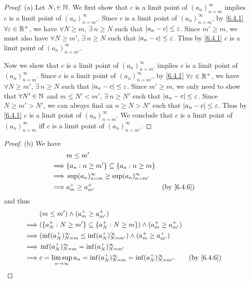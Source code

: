 \begin{proof}{(a)}
  Let \(N, \in \mathbb{N}\).
  We first show that \(c\) is a limit point of \((a_n)_{n = m}^\infty\) implies \(c\) is a limit point of \((a_n)_{n = m'}^\infty\).
  Since \(c\) is a limit point of \((a_n)_{n = m}^\infty\), by \cref{6.4.1} \(\forall \varepsilon \in \mathbb{R}^+\), we have \(\forall N \geq m\), \(\exists\ n \geq N\) such that \(\left\lvert a_n - c\right\rvert \leq \varepsilon\).
  Since \(m' \geq m\), we must also have \(\forall N \geq m'\), \(\exists\ n \geq N\) such that \(\left\lvert a_n - c\right\rvert \leq \varepsilon\).
  Thus by \cref{6.4.1} \(c\) is a limit point of \((a_n)_{n = m'}^\infty\).

  Now we show that \(c\) is a limit point of \((a_n)_{n = m'}^\infty\) implies \(c\) is a limit point of \((a_n)_{n = m}^\infty\).
  Since \(c\) is a limit point of \((a_n)_{n = m'}^\infty\), by \cref{6.4.1} \(\forall \varepsilon \in \mathbb{R}^+\), we have \(\forall N \geq m'\), \(\exists\ n \geq N\) such that \(\left\lvert a_n - c\right\rvert \leq \varepsilon\).
  Since \(m' \geq m\), we only need to show that \(\forall N' \in \mathbb{N}\) and \(m \leq N' < m'\), \(\exists\ n \geq N'\) such that \(\left\lvert a_n - c\right\rvert \leq \varepsilon\).
  Since \(N \geq m' > N'\), we can always find an \(n \geq N > N'\) such that \(\left\lvert a_n - c\right\rvert \leq \varepsilon\).
  Thus by \cref{6.4.1} \(c\) is a limit point of \((a_n)_{n = m}^\infty\).
  We conclude that \(c\) is a limit point of \((a_n)_{n = m}^\infty\) iff \(c\) is a limit point of \((a_n)_{n = m'}^\infty\).
\end{proof}

\begin{proof}{(b)}
  We have
  \begin{align*}
             & m \leq m'                                                               \\
    \implies & \{a_n : n \geq m'\} \subseteq \{a_n : n \geq m\}                        \\
    \implies & \sup(a_n)_{n = m}^\infty \geq \sup(a_n)_{n = m'}^\infty                 \\
    \implies & a_m^+ \geq a_{m'}^+                                     &  & \by{6.4.6}
  \end{align*}
  and thus
  \begin{align*}
             & (m \leq m') \land (a_m^+ \geq a_{m'}^+)                                                                    \\
    \implies & (\{a_N^+ : N \geq m'\} \subseteq \{a_N^+ : N \geq m\}) \land (a_m^+ \geq a_{m'}^+)                         \\
    \implies & (\inf(a_N^+)_{N = m}^\infty \leq \inf(a_N^+)_{N = m'}^\infty) \land (a_m^+ \geq a_{m'}^+)                  \\
    \implies & \inf(a_N^+)_{N = m}^\infty = \inf(a_N^+)_{N = m'}^\infty                                                   \\
    \implies & c = \limsup_{n \to \infty} a_n = \inf(a_N^+)_{N = m}^\infty = \inf(a_N^+)_{N = m'}^\infty. &  & \by{6.4.6}
  \end{align*}
\end{proof}

